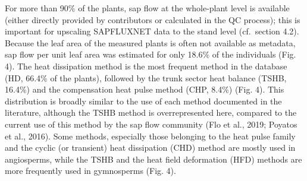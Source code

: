\documentclass[11pt,twoside]{reedthesis}
\begin{document}
For more than 90\% of the plants, sap flow at the whole-plant level is
available (either directly provided by contributors or calculated in the
QC process); this is important for upscaling SAPFLUXNET data to the
stand level (cf.~section 4.2). Because the leaf area of the measured
plants is often not available as metadata, sap flow per unit leaf area
was estimated for only 18.6\% of the individuals (Fig. 4). The heat
dissipation method is the most frequent method in the database (HD,
66.4\% of the plants), followed by the trunk sector heat balance (TSHB,
16.4\%) and the compensation heat pulse method (CHP, 8.4\%) (Fig. 4).
This distribution is broadly similar to the use of each method
documented in the literature, although the TSHB method is
overrepresented here, compared to the current use of this method by the
sap flow community (Flo et al., 2019; Poyatos et al., 2016). Some
methods, especially those belonging to the heat pulse family and the
cyclic (or transient) heat dissipation (CHD) method are mostly used in
angiosperms, while the TSHB and the heat field deformation (HFD) methods
are more frequently used in gymnosperms (Fig. 4).\par
\end{document}
